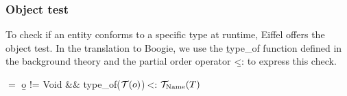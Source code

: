 \subsubsection{Object test}

To check if an entity conforms to a specific type at runtime, Eiffel offers the object test.
In the translation to Boogie, we use the \b{type_of} function defined in the background theory and the partial order operator \b{<:} to express this check.
\begin{center}
 $=$ \b{o != Void && type_of($\tr{o}$)$\ $<:$\ \ts{Name}{T}$}
\end{center}


